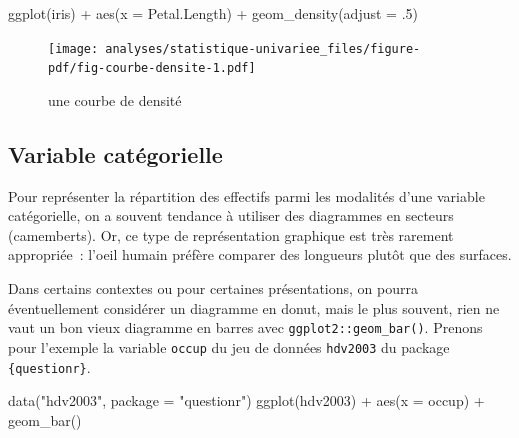 \documentclass[
  letterpaper,
  DIV=11,
  numbers=noendperiod,
  oneside]{scrreprt}
\newenvironment{Shaded}{\begin{snugshade}}{\end{snugshade}}
\newcommand{\AttributeTok}[1]{\textcolor[rgb]{0.40,0.45,0.13}{#1}}
\newcommand{\DecValTok}[1]{\textcolor[rgb]{0.68,0.00,0.00}{#1}}
\newcommand{\FunctionTok}[1]{\textcolor[rgb]{0.28,0.35,0.67}{#1}}
\newcommand{\NormalTok}[1]{\textcolor[rgb]{0.00,0.23,0.31}{#1}}
\newcommand{\SpecialCharTok}[1]{\textcolor[rgb]{0.37,0.37,0.37}{#1}}
\newcommand{\StringTok}[1]{\textcolor[rgb]{0.13,0.47,0.30}{#1}}
\begin{document}
\begin{Shaded}
\begin{Highlighting}[]
\FunctionTok{ggplot}\NormalTok{(iris) }\SpecialCharTok{+}
  \FunctionTok{aes}\NormalTok{(}\AttributeTok{x =}\NormalTok{ Petal.Length) }\SpecialCharTok{+}
  \FunctionTok{geom\_density}\NormalTok{(}\AttributeTok{adjust =}\NormalTok{ .}\DecValTok{5}\NormalTok{)}
\end{Highlighting}
\end{Shaded}

\begin{figure}[H]

{\centering \texttt{[image: analyses/statistique-univariee\_files/figure-pdf/fig-courbe-densite-1.pdf]}

}

\caption{\label{fig-courbe-densite}une courbe de densité}

\end{figure}

\hypertarget{sec-graph-univ-var-cat}{%
\subsection{Variable catégorielle}\label{sec-graph-univ-var-cat}}

Pour représenter la répartition des effectifs parmi les modalités d'une
variable catégorielle, on a souvent tendance à utiliser des diagrammes
en secteurs (camemberts). Or, ce type de représentation graphique est
très rarement appropriée~: l'oeil humain préfère comparer des longueurs
plutôt que des surfaces.

Dans certains contextes ou pour certaines présentations, on pourra
éventuellement considérer un diagramme en donut, mais le plus souvent,
rien ne vaut un bon vieux diagramme en barres avec
\texttt{ggplot2::geom\_bar()}. Prenons pour l'exemple la variable
\texttt{occup} du jeu de données \texttt{hdv2003} du package
\texttt{\{questionr\}}.

\begin{Shaded}
\begin{Highlighting}[]
\FunctionTok{data}\NormalTok{(}\StringTok{"hdv2003"}\NormalTok{, }\AttributeTok{package =} \StringTok{"questionr"}\NormalTok{)}
\FunctionTok{ggplot}\NormalTok{(hdv2003) }\SpecialCharTok{+}
  \FunctionTok{aes}\NormalTok{(}\AttributeTok{x =}\NormalTok{ occup) }\SpecialCharTok{+}
  \FunctionTok{geom\_bar}\NormalTok{()}
\end{Highlighting}
\end{Shaded}
\end{document}
